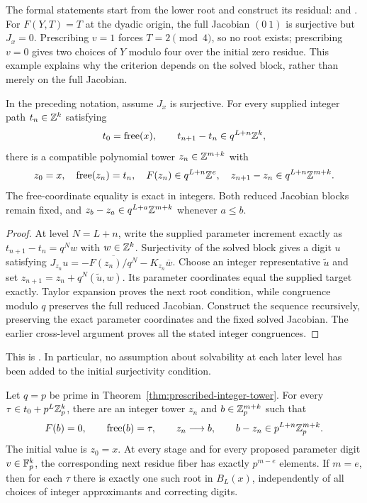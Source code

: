 The formal statements start from the lower root and construct its residual:
and .
For $F(Y,T)=T$ at the dyadic origin, the full Jacobian $(0\ 1)$ is
surjective but $J_x=0$. Prescribing $v=1$ forces $T=2\pmod4$, so no root
exists; prescribing $v=0$ gives two choices of $Y$ modulo four over the
initial zero residue. This example explains why the criterion depends on
the solved block, rather than merely on the full Jacobian.

\begin{theorem}
\label{thm:prescribed-integer-tower}
In the preceding notation, assume $J_x$ is surjective. For every supplied
integer path $t_n\in\mathbb Z^k$ satisfying
\[
 t_0=\operatorname{free}(x),\qquad
 t_{n+1}-t_n\in q^{L+n}\mathbb Z^k,
\]
there is a compatible polynomial tower $z_n\in\mathbb Z^{m+k}$ with
\[
 z_0=x,\quad \operatorname{free}(z_n)=t_n,\quad
 F(z_n)\in q^{L+n}\mathbb Z^e,\quad
 z_{n+1}-z_n\in q^{L+n}\mathbb Z^{m+k}.
\]
The free-coordinate equality is exact in integers. Both reduced Jacobian
blocks remain fixed, and $z_b-z_a\in q^{L+a}\mathbb Z^{m+k}$ whenever $a\le b$.
\end{theorem}

\begin{proof}
At level $N=L+n$, write the supplied parameter increment exactly as
$t_{n+1}-t_n=q^Nw$ with $w\in\mathbb Z^k$. Surjectivity of the solved block
gives a digit $u$ satisfying
$J_{z_n}u=-\overline{F(z_n)/q^N}-K_{z_n}\overline w$.
Choose an integer representative $\widetilde u$ and set
$z_{n+1}=z_n+q^N(\widetilde u,w)$. Its parameter coordinates equal the
supplied target exactly. Taylor expansion proves the next root condition,
while congruence modulo $q$ preserves the full reduced Jacobian.
Construct the sequence recursively, preserving the exact parameter
coordinates and the fixed solved Jacobian. The earlier cross-level
argument proves all the stated integer congruences.
\end{proof}

This is
.
In particular, no assumption about solvability at each later level has been
added to the initial surjectivity condition.

\begin{theorem}
\label{thm:prescribed-padic-tower}
Let $q=p$ be prime in Theorem~\ref{thm:prescribed-integer-tower}.
For every $\tau\in t_0+p^L\mathbb Z_p^k$, there are an integer tower $z_n$ and
$b\in\mathbb Z_p^{m+k}$ such that
\[
 F(b)=0,\qquad\operatorname{free}(b)=\tau,\qquad
 z_n\longrightarrow b,\qquad b-z_n\in p^{L+n}\mathbb Z_p^{m+k}.
\]
The initial value is $z_0=x$. At every stage and for every proposed
parameter digit $v\in\mathbb F_p^k$, the corresponding next residue fiber has
exactly $p^{m-e}$ elements. If $m=e$, then for each $\tau$ there is exactly
one such root in $B_L(x)$, independently of all choices of integer
approximants and correcting digits.
\end{theorem}

